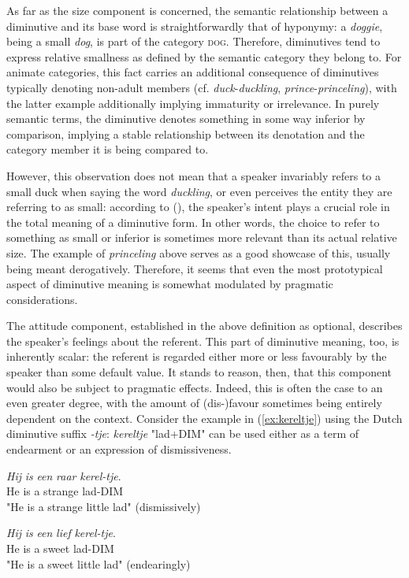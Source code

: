 As far as the size component is concerned, the semantic relationship between a diminutive and its base word is straightforwardly that of hyponymy: a \textit{doggie}, being a small \textit{dog}, is part of the category \textsc{dog}. Therefore, diminutives tend to express relative smallness as defined by the semantic category they belong to. For animate categories, this fact carries an additional consequence of diminutives typically denoting non-adult members (cf. \textit{duck}-\textit{duckling}, \textit{prince}-\textit{princeling}), with the latter example additionally implying immaturity or irrelevance. In purely semantic terms, the diminutive denotes something in some way inferior by comparison, implying a stable relationship between its denotation and the category member it is being compared to.

However, this observation does not mean that a speaker invariably refers to a small duck when saying the word \textit{duckling}, or even perceives the entity they are referring to as small: according to \citeauthor{Schneider+2003} (\citeyear{Schneider+2003}), the speaker's intent plays a crucial role in the total meaning of a diminutive form. In other words, the choice to refer to something as small or inferior is sometimes more relevant than its actual relative size. The example of \textit{princeling} above serves as a good showcase of this, usually being meant derogatively. Therefore, it seems that even the most prototypical aspect of diminutive meaning is somewhat modulated by pragmatic considerations.

The attitude component, established in the above definition as optional, describes the speaker's feelings about the referent. This part of diminutive meaning, too, is inherently scalar: the referent is regarded either more or less favourably by the speaker than some default value. It stands to reason, then, that this component would also be subject to pragmatic effects. Indeed, this is often the case to an even greater degree, with the amount of (dis-)favour sometimes being entirely dependent on the context. Consider the example in (\ref{ex:kereltje}) using the Dutch diminutive suffix \textit{-tje}: \textit{kereltje} "lad+DIM" can be used either as a term of endearment or an expression of dismissiveness.

\begin{exe}
\ex \label{ex:kereltje} 
\begin{xlist}
\ex \gll
\textit{Hij} \textit{is} \textit{een} \textit{raar} \textit{kerel-tje}.\\
He	is	a  strange	lad-DIM\\
\trans "He is a strange little lad" (dismissively)

\ex \gll
\textit{Hij} \textit{is} \textit{een} \textit{lief} \textit{kerel-tje}.\\
He	is	a  sweet	lad-DIM\\
\trans "He is a sweet little lad" (endearingly)
\end{xlist}
\end{exe}

